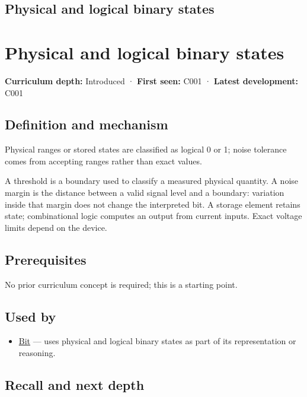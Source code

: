 \hypertarget{appendix-ea798b1ceb35}{}
\section*{Physical and logical binary states}
\chapter{Physical and logical binary states}\label{appendix-ea798b1ceb35-physical-and-logical-binary-states}

\textbf{Curriculum depth:} Introduced · \textbf{First seen:} C001 · \textbf{Latest development:} C001

\section{Definition and mechanism}\label{appendix-ea798b1ceb35-definition-and-mechanism}

Physical ranges or stored states are classified as logical 0 or 1; noise tolerance comes from accepting ranges rather than exact values.

A threshold is a boundary used to classify a measured physical quantity. A noise margin is the distance between a valid signal level and a boundary: variation inside that margin does not change the interpreted bit. A storage element retains state; combinational logic computes an output from current inputs. Exact voltage limits depend on the device.

\section{Prerequisites}\label{appendix-ea798b1ceb35-prerequisites}

No prior curriculum concept is required; this is a starting point.

\section{Used by}\label{appendix-ea798b1ceb35-used-by}

\begin{itemize}
\tightlist
\item
  \hyperref[appendix-ddbb69998a2e]{Bit} --- uses physical and logical binary states as part of its representation or reasoning.
\end{itemize}

\section{Recall and next depth}\label{appendix-ea798b1ceb35-recall-and-next-depth}

